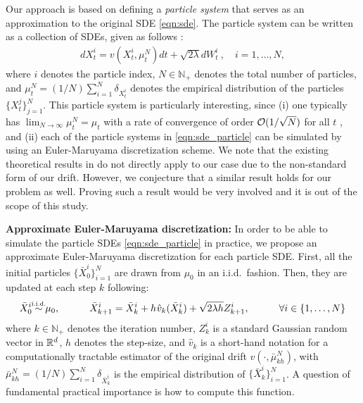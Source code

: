 Our approach is based on defining a \emph{particle system} that serves as an approximation to the original SDE \eqref{eqn:sde}. The particle system can be written as a collection of SDEs, given as follows \cite{bossy1997stochastic}:
\begin{align}
d X_t^i = v(X_t^i, \mu_t^{N}) dt + \sqrt{2 \lambda } d W_t^i \> , \quad i = 1,\dots, N, \label{eqn:sde_particle}
\end{align}
where $i$ denotes the particle index, $N \in \mathbb{N}_+$ denotes the total number of particles, and $\mu_t^N = (1/N) \sum_{i=1}^N \delta_{X_t^i}$ denotes the empirical distribution of the particles $\{X_t^j\}_{j=1}^N$. This particle system is particularly interesting, since (i) one typically has $\lim_{N \rightarrow \infty} \mu_t^{N}= \mu_t $ with a rate of convergence of order ${\cal O}(1/\sqrt{N})$ for all $t$ \cite{malrieu03,cgm-08}, and (ii) each of the particle systems in \eqref{eqn:sde_particle} can be simulated by using an Euler-Maruyama discretization scheme. We note that the existing theoretical results in \cite{veretennikov2006ergodic,mishura2016existence} do not directly apply to our case due to the non-standard form of our drift. However, we conjecture that a similar result holds for our problem as well. Proving such a result would be very involved and it is out of the scope of this study. %

\textbf{Approximate Euler-Maruyama discretization:}
%
In order to be able to simulate the particle SDEs \eqref{eqn:sde_particle} in practice, we propose an approximate Euler-Maruyama discretization for each particle SDE. First, all the initial particles $\{\bar{X}_0^i\}_{i=1}^N$ are drawn from $\mu_0$ in an i.i.d.\ fashion. Then, they are updated at each step $k$ following:
\begin{align}
\bar{X}^i_0 \simiid \mu_0, \quad \qquad \bar{X}^i_{k+1} = \bar{X}^i_k + h \hspace{0.5pt} \hat{v}_k(\bar{X}^i_k) + \sqrt{2 \lambda h} Z^i_{k+1}, \quad \qquad  \forall i \in  \{1,\dots,N\} \label{eqn:euler_particle}
\end{align}
where $k \in \mathbb{N}_+$ denotes the iteration number, $Z^i_k$ is a standard Gaussian random vector in $\mathbb{R}^d$, $h$ denotes the step-size, and $\hat{v}_k$ is a short-hand notation for a computationally tractable estimator of the original drift $v(\cdot, \bar{\mu}_{kh}^N)$, with $\bar{\mu}_{kh}^{N} = (1/N) \sum_{i=1}^N \delta_{\bar{X}_k^i}$ is the empirical distribution of $\{\bar{X}_k^i\}_{i=1}^N$. A question of fundamental practical importance is how to compute this function.

